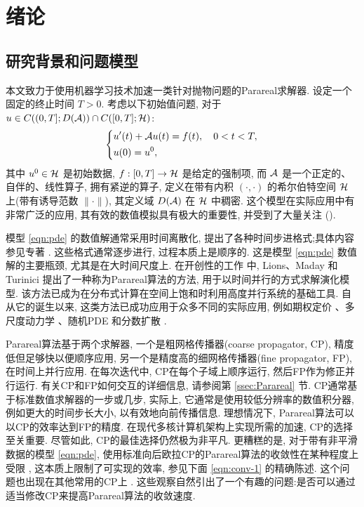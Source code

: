 \section{绪论}
\subsection{研究背景和问题模型}
本文致力于使用机器学习技术加速一类针对抛物问题的Parareal求解器. 设定一个固定的终止时间 \( T > 0 \). 考虑以下初始值问题, 对于 \( u \in C((0,T];D({\mathcal{A}}))\cap C([0,T];{\mathcal{H}}) \):
\begin{equation}\label{eqn:pde}
	\left \{
	\begin{aligned}
		&u' (t) + {\mathcal{A}} u(t) = f(t), \quad 0<t<T,\\
		& u(0)=u^0 ,
	\end{aligned}\right .
\end{equation}
其中 \( u^0 \in {\mathcal{H}} \) 是初始数据, \( f : [0,T] \to {\mathcal{H}} \) 是给定的强制项, 而 \( {\mathcal{A}} \) 是一个正定的、自伴的、线性算子, 拥有紧逆的算子, 定义在带有内积 \( (\cdot , \cdot ) \) 的希尔伯特空间 \( {\mathcal{H}} \) 上(带有诱导范数 \( \|\cdot\| \)), 其定义域 \( D({\mathcal{A}}) \) 在 \( {\mathcal{H}} \) 中稠密. 这个模型在实际应用中有非常广泛的应用, 其有效的数值模拟具有极大的重要性, 并受到了大量关注 (\cite{thomee2007galerkin}). 

模型 \eqref{eqn:pde} 的数值解通常采用时间离散化, 提出了各种时间步进格式;具体内容参见专著 \cite{thomee2007galerkin}. 这些格式通常逐步进行, 过程本质上是顺序的. 这是模型 \eqref{eqn:pde} 数值解的主要瓶颈, 尤其是在大时间尺度上. 在开创性的工作 \cite{LionsMadayTurinici:2001} 中, Lions、Maday 和 Turinici 提出了一种称为Parareal算法的方法, 用于以时间并行的方式求解演化模型. 该方法已成为在分布式计算在空间上饱和时利用高度并行系统的基础工具. 自从它的诞生以来, 这类方法已成功应用于众多不同的实际应用, 例如期权定价 \cite{BalMaday:2002,PagesPironneau:2016}、多尺度动力学 \cite{ArielKim:2016,Engblom:2009}、随机PDE \cite{BrehierWang:2020} 和分数扩散 \cite{LiHu:2021,XuHesthaven:2015}. 

Parareal算法基于两个求解器, 一个是粗网格传播器(coarse propagator, CP), 精度低但足够快以便顺序应用, 另一个是精度高的细网格传播器(fine propagator, FP), 在时间上并行应用. 在每次迭代中, CP在每个子域上顺序运行, 然后FP作为修正并行运行. 有关CP和FP如何交互的详细信息, 请参阅第 \ref{ssec:Parareal} 节. CP通常基于标准数值求解器的一步或几步, 实际上, 它通常是使用较低分辨率的数值积分器, 例如更大的时间步长大小, 以有效地向前传播信息. 理想情况下, Parareal算法可以以CP的效率达到FP的精度. 在现代多核计算机架构上实现所需的加速, CP的选择至关重要. 尽管如此, CP的最佳选择仍然极为非平凡. 更糟糕的是, 对于带有非平滑数据的模型 \eqref{eqn:pde}, 使用标准向后欧拉CP的Parareal算法的收敛性在某种程度上受限 \cite{FriedhoffSouthworth:2021,Mathew:2010,Wu:IMA2015,yang2021robust}, 这本质上限制了可实现的效率, 参见下面 \eqref{eqn:conv-1} 的精确陈述. 这个问题也出现在其他常用的CP上 \cite[表 1 和 2]{FriedhoffSouthworth:2021}. 这些观察自然引出了一个有趣的问题:是否可以通过适当修改CP来提高Parareal算法的收敛速度. 




